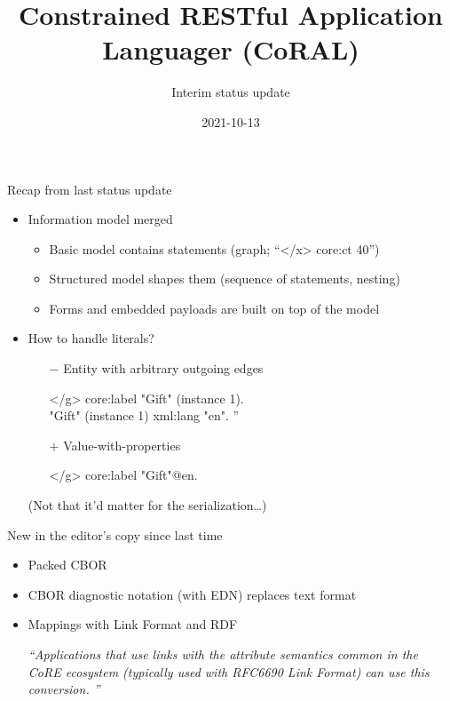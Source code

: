 \documentclass[aspectratio=169]{beamer}
\title{Constrained RESTful Application Languager (CoRAL)}
\subtitle{Interim status update}
\date{2021-10-13}
\begin{document}
\frame{\titlepage}

\begin{frame}{Recap from last status update}\Large
  \begin{itemize}
    \item Information model merged
      \begin{itemize}\large
        \item Basic model contains statements (graph; ``</x> core:ct 40'')
        \item Structured model shapes them (sequence of statements, nesting)
        \item Forms and embedded payloads are built on top of the model
      \end{itemize}
    \bigskip
    \item How to handle literals?
      \begin{itemize}\large
        \item[$-$] Entity with arbitrary outgoing edges

          </g> core:label "Gift" (instance 1).\\
          "Gift" (instance 1) xml:lang "en".
''
        \item[$+$] Value-with-properties

          </g> core:label "Gift"@en.
      \end{itemize}
      \footnotesize (Not that it'd matter for the serialization\ldots)
  \end{itemize}
\end{frame}

\begin{frame}{New in the editor's copy since last time}\Large
  \begin{itemize}
    \item Packed CBOR
    \item CBOR diagnostic notation (with EDN) replaces text format
    \item Mappings with Link Format and RDF

      \bigskip

      \em{``Applications that use links with the attribute semantics common in the CoRE ecosystem (typically used with RFC6690 Link Format) can use this conversion. ''}
  \end{itemize}
\end{frame}
\end{document}
